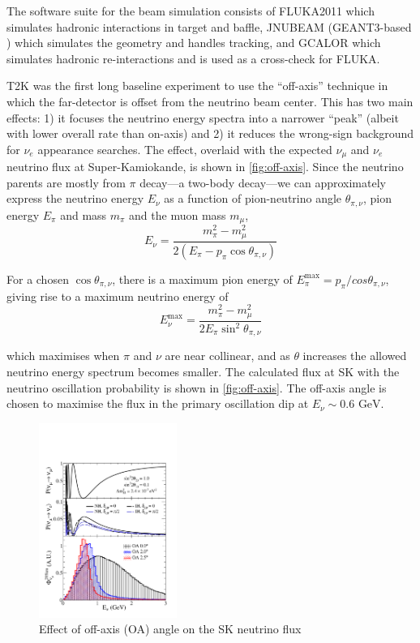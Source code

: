 The software suite for the beam simulation consists of FLUKA2011 \cite{fluka2008_1, fluka2008_2, fluka2011} which simulates hadronic interactions in target and baffle, JNUBEAM (GEANT3-based \cite{geant3}) which simulates the geometry and handles tracking, and GCALOR \cite{gcalor} which simulates hadronic re-interactions and is used as a cross-check for FLUKA\cite{t2k_beam, t2k_tn_flux}.

T2K was the first long baseline experiment to use the ``off-axis'' technique\cite{off_axis} in which the far-detector is offset from the neutrino beam center. This has two main effects: 1) it focuses the neutrino energy spectra into a narrower ``peak'' (albeit with lower overall rate than on-axis) and 2) it reduces the wrong-sign background for $\nu_e$ appearance searches. The effect, overlaid with the expected $\nu_\mu$ and $\nu_e$ neutrino flux at Super-Kamiokande, is shown in \autoref{fig:off-axis}. Since the neutrino parents are mostly from $\pi$ decay---a two-body decay---we can approximately express the neutrino energy $E_\nu$ as a function of pion-neutrino angle $\theta_{\pi,\nu}$, pion energy $E_\pi$ and mass $m_\pi$ and the muon mass $m_\mu$,
\begin{equation}
	E_\nu = \frac{m^2_\pi-m^2_\mu}{2\left( E_\pi - p_\pi \cos \theta_{\pi,\nu} \right)} 
\end{equation}

For a chosen $\cos \theta_{\pi,\nu}$, there is a maximum pion energy of $E_\pi^\text{max} = p_\pi/cos\theta_{\pi,\nu}$, giving rise to a maximum neutrino energy of
\begin{equation}
	E_\nu^\text{max} = \frac{m^2_\pi-m^2_\mu}{2E_\pi \sin^2 \theta_{\pi,\nu}} 
\end{equation}

which maximises when $\pi$ and $\nu$ are near collinear, and as $\theta$ increases the allowed neutrino energy spectrum becomes smaller. The calculated flux at SK with the neutrino oscillation probability is shown in \autoref{fig:off-axis}. The off-axis angle is chosen to maximise the flux in the primary oscillation dip at $E_\nu \sim 0.6\text{ GeV}$.
\begin{figure}[h]
	\includegraphics[width=0.4\textwidth, trim={0mm 0mm 0mm 0mm}, clip,page=1]{figures/det_chap/oaeffect_pnue_pnumu_flux}
	\caption{Effect of off-axis (OA) angle on the SK neutrino flux}
	\label{fig:off-axis}
\end{figure}

